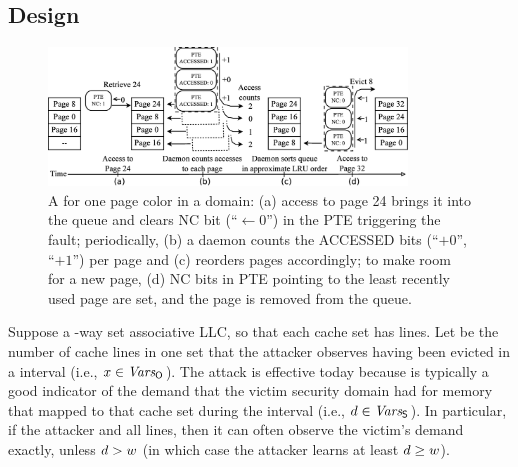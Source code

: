 \subsection{Design}
\label{cachebar:sec:cacheabilityMgmt:design}
\begin{figure}[t]
\centering
\includegraphics[width=0.85\textwidth]{fig/cachebar/queue-all.eps}
\caption[A \lru for one page color in a domain]{A \lru for one page color in a domain: (a) access to page 24
brings it into the queue and clears NC bit (``$\leftarrow\!0$'') in
the PTE triggering the fault; periodically, (b) a daemon counts
the ACCESSED bits (``$+0$'', ``$+1$'') per page and (c) reorders pages
accordingly; to make room for a new page, (d) NC bits in PTE
pointing to the least recently used page are set, and the page is
removed from the queue.}
\label{fig:queues:all}
\vspace{-0.1in}
\end{figure}
Suppose a \cacheLineNmbr-way set associative \gls{LLC}, so that each
cache set has \cacheLineNmbr lines.  Let \evictedNmbr be the number of
cache lines in one set that the attacker observes having been evicted
in a \primeprobe interval (i.e., $x \in \mathit{Vars_{\mathsf{O}_{}}}{}$).  The
\primeprobe attack is effective today because \evictedNmbr is
typically a good indicator of the demand \victimDemand that the victim
security domain had for memory that mapped to that cache set during
the \primeprobe interval (i.e., $d\in \mathit{Vars_{\mathsf{S}_{}}}{}$).  In
particular, if the attacker  and  all \cacheLineNmbr
lines, then it can often observe the victim's demand \victimDemand
exactly, unless $d > w$ (in which case the
attacker learns at least $d \ge w$).


